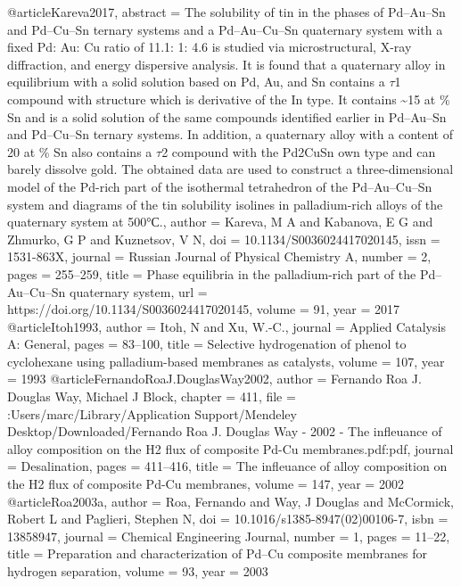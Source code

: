 @article{Kareva2017,
abstract = {The solubility of tin in the phases of Pd–Au–Sn and Pd–Cu–Sn ternary systems and a Pd–Au–Cu–Sn quaternary system with a fixed Pd: Au: Cu ratio of 11.1: 1: 4.6 is studied via microstructural, X-ray diffraction, and energy dispersive analysis. It is found that a quaternary alloy in equilibrium with a solid solution based on Pd, Au, and Sn contains a $\tau$1 compound with structure which is derivative of the In type. It contains {\~{}}15 at {\%} Sn and is a solid solution of the same compounds identified earlier in Pd–Au–Sn and Pd–Cu–Sn ternary systems. In addition, a quaternary alloy with a content of 20 at {\%} Sn also contains a $\tau$2 compound with the Pd2CuSn own type and can barely dissolve gold. The obtained data are used to construct a three-dimensional model of the Pd-rich part of the isothermal tetrahedron of the Pd–Au–Cu–Sn system and diagrams of the tin solubility isolines in palladium-rich alloys of the quaternary system at 500°С.},
author = {Kareva, M A and Kabanova, E G and Zhmurko, G P and Kuznetsov, V N},
doi = {10.1134/S0036024417020145},
issn = {1531-863X},
journal = {Russian Journal of Physical Chemistry A},
number = {2},
pages = {255--259},
title = {{Phase equilibria in the palladium-rich part of the Pd–Au–Cu–Sn quaternary system}},
url = {https://doi.org/10.1134/S0036024417020145},
volume = {91},
year = {2017}
}
@article{Itoh1993,
author = {Itoh, N and Xu, W.-C.},
journal = {Applied Catalysis A: General},
pages = {83--100},
title = {{Selective hydrogenation of phenol to cyclohexane using palladium-based membranes as catalysts}},
volume = {107},
year = {1993}
}
@article{FernandoRoaJ.DouglasWay2002,
author = {{Fernando Roa J. Douglas Way}, Michael J Block},
chapter = {411},
file = {:Users/marc/Library/Application Support/Mendeley Desktop/Downloaded/Fernando Roa J. Douglas Way - 2002 - The infleuance of alloy composition on the H2 flux of composite Pd-Cu membranes.pdf:pdf},
journal = {Desalination},
pages = {411--416},
title = {{The infleuance of alloy composition on the H2 flux of composite Pd-Cu membranes}},
volume = {147},
year = {2002}
}
@article{Roa2003a,
author = {Roa, Fernando and Way, J Douglas and McCormick, Robert L and Paglieri, Stephen N},
doi = {10.1016/s1385-8947(02)00106-7},
isbn = {13858947},
journal = {Chemical Engineering Journal},
number = {1},
pages = {11--22},
title = {{Preparation and characterization of Pd–Cu composite membranes for hydrogen separation}},
volume = {93},
year = {2003}
}
